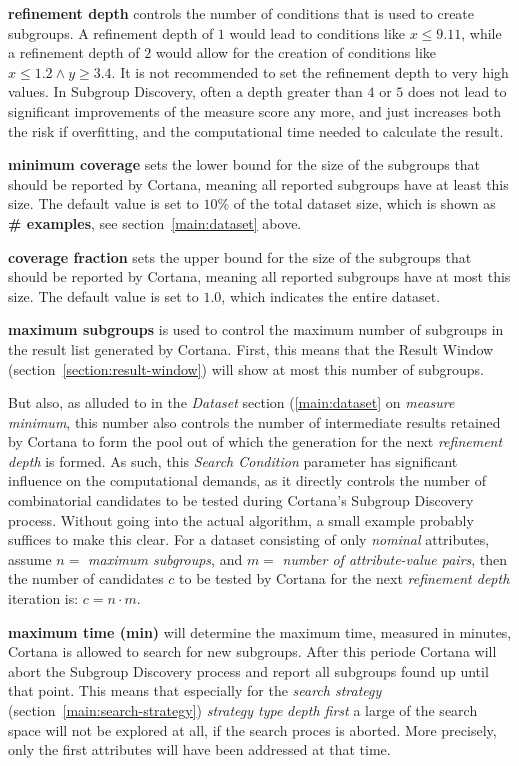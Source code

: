\documentclass{article}
\begin{document}
\textbf{refinement depth} controls the number of conditions that is used to create subgroups.
A refinement depth of $1$ would lead to conditions like $x \leq 9.11$, while a refinement depth of $2$ would allow for the creation of conditions like $x \leq 1.2 \wedge y \geq 3.4$.
It is not recommended to set the refinement depth to very high values.
In Subgroup Discovery, often a depth greater than $4$ or $5$ does not lead to significant improvements of the measure score any more, and just increases both the risk if overfitting, and the computational time needed to calculate the result.

\textbf{minimum coverage} sets the lower bound for the size of the subgroups that should be reported by Cortana, meaning all reported subgroups have at least this size.
The default value is set to $10\%$ of the total dataset size, which is shown as \textbf{\# examples}, see section~\ref{main:dataset} above.

\textbf{coverage fraction} sets the upper bound for the size of the subgroups that should be reported by Cortana, meaning all reported subgroups have at most this size.
The default value is set to $1.0$, which indicates the entire dataset.

\textbf{maximum subgroups} is used to control the maximum number of subgroups in the result list generated by Cortana.
First, this means that the Result Window (section~\ref{section:result-window}) will show at most this number of subgroups.

But also, as alluded to in the \emph{Dataset} section (\ref{main:dataset} on \emph{measure minimum}, this number also controls the number of intermediate results retained by Cortana to form the pool out of which the generation for the next \emph{refinement depth} is formed.
As such, this \emph{Search Condition} parameter has significant influence on the computational demands, as it directly controls the number of combinatorial candidates to be tested during Cortana's Subgroup Discovery process.
Without going into the actual algorithm, a small example probably suffices to make this clear.
For a dataset consisting of only \emph{nominal} attributes, assume $n =$ \emph{maximum subgroups}, and $m =$ \emph{number of attribute-value pairs}, then the number of candidates $c$ to be tested by Cortana for the next \emph{refinement depth} iteration is: $c = n \cdot m$.

\textbf{maximum time (min)} will determine the maximum time, measured in minutes, Cortana is allowed to search for new subgroups.
After this periode Cortana will abort the Subgroup Discovery process and report all subgroups found up until that point.
This means that especially for the \emph{search strategy} (section~\ref{main:search-strategy}) \emph{strategy type} \emph{depth first} a large of the search space will not be explored at all, if the search proces is aborted.
More precisely, only the first attributes will have been addressed at that time.
\end{document}
